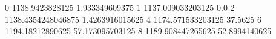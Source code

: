 0 1138.9423828125 1.933349609375
1 1137.009033203125 0.0
2 1138.4354248046875 1.4263916015625
4 1174.571533203125 37.5625
6 1194.18212890625 57.173095703125
8 1189.908447265625 52.8994140625
